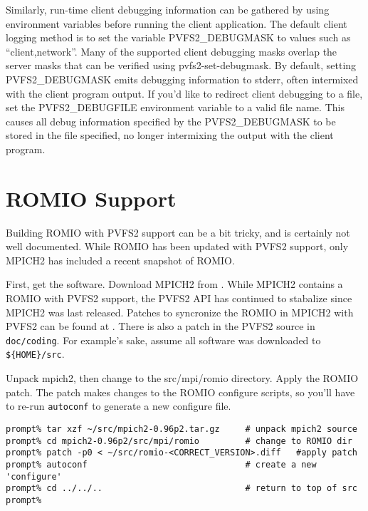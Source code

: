 \documentclass[11pt, letterpaper]{article}
\begin{document}
Similarly, run-time client debugging information can be gathered by
using environment variables before running the client application.
The default client logging method is to set the variable
PVFS2\_DEBUGMASK to values such as ``client,network''.  Many of the
supported client debugging masks overlap the server masks that can be
verified using pvfs2-set-debugmask.  By default, setting
PVFS2\_DEBUGMASK emits debugging information to stderr, often
intermixed with the client program output.  If you'd like to redirect
client debugging to a file, set the PVFS2\_DEBUGFILE environment
variable to a valid file name.  This causes all debug information
specified by the PVFS2\_DEBUGMASK to be stored in the file specified,
no longer intermixing the output with the client program.

\section{ROMIO Support}
\label{sec:romio}

Building ROMIO with PVFS2 support can be a bit tricky, and is certainly
not well documented.  While ROMIO has been updated with PVFS2 support,
only MPICH2 has included a recent snapshot of ROMIO.  

First, get the software.  Download MPICH2 from .
While MPICH2 contains a ROMIO with PVFS2 support, the PVFS2 API has
continued to stabalize since MPICH2 was last released.  Patches to
syncronize the ROMIO in MPICH2 with PVFS2 can be found at
.
There is also a patch in the PVFS2 source in {\tt doc/coding}. For
example's sake, assume all software was downloaded to {\tt \$\{HOME\}/src}. 

Unpack mpich2, then change to the src/mpi/romio directory.  Apply the
ROMIO patch.  The patch makes changes to the ROMIO configure scripts, so you'll have to re-run {\tt autoconf} to generate a new configure file.

\begin{verbatim}
prompt% tar xzf ~/src/mpich2-0.96p2.tar.gz     # unpack mpich2 source
prompt% cd mpich2-0.96p2/src/mpi/romio         # change to ROMIO dir
prompt% patch -p0 < ~/src/romio-<CORRECT_VERSION>.diff   #apply patch
prompt% autoconf                               # create a new 'configure'
prompt% cd ../../..                            # return to top of src
prompt% 
\end{verbatim}
\end{document}
